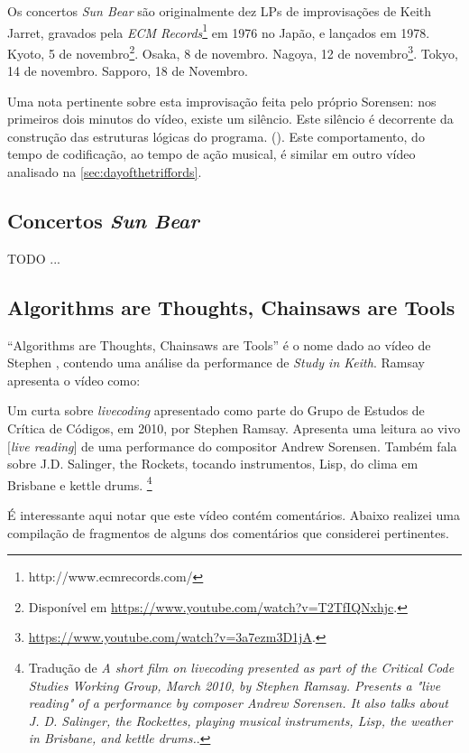\documentclass[
	12pt,				%
	openright,			%
	twoside,			%
	a4paper,			%
	english,			%
	french,				%
	spanish,			%
        italian,                        %
	brazil				%
	]{abntex2}
\begin{document}
Os concertos \emph{Sun Bear} são originalmente dez LPs  de improvisações de Keith Jarret, gravados pela \emph{ECM Records}\footnote{http://www.ecmrecords.com/} em 1976 no Japão, e lançados em 1978. Kyoto, 5 de novembro\footnote{Disponível em \url{https://www.youtube.com/watch?v=T2TfIQNxhjc}.}. Osaka, 8 de novembro. Nagoya, 12 de novembro\footnote{\url{https://www.youtube.com/watch?v=3a7ezm3D1jA}.}. Tokyo, 14 de novembro. Sapporo, 18 de Novembro.

Uma nota pertinente sobre esta improvisação feita pelo próprio Sorensen: nos primeiros dois minutos do vídeo, existe um silêncio. Este silêncio é decorrente da construção das estruturas lógicas do programa. (). Este comportamento, do tempo de codificação, ao tempo de ação musical, é similar em outro vídeo analisado na  \autoref{sec:dayofthetriffords}. 

\subsection{Concertos \emph{Sun Bear}}

TODO ...

\subsection{Algorithms are Thoughts, Chainsaws are Tools}

``Algorithms are Thoughts, Chainsaws are Tools'' é o nome dado ao vídeo de Stephen , contendo uma análise da performance de \emph{Study in Keith}. Ramsay apresenta o vídeo como:

\begin{citacao}
Um curta sobre \emph{livecoding} apresentado como parte do Grupo de Estudos de Crítica de Códigos, em 2010, por Stephen Ramsay. Apresenta uma leitura ao vivo $[$\emph{live reading}$]$ de uma performance do compositor Andrew Sorensen. Também fala sobre J.D. Salinger, the Rockets, tocando instrumentos, Lisp, do clima em Brisbane e kettle drums. \footnote{Tradução de \emph{A short film on livecoding presented as part of the Critical Code Studies Working Group, March 2010, by Stephen Ramsay. Presents a "live reading" of a performance by composer Andrew Sorensen. It also talks about J. D. Salinger, the Rockettes, playing musical instruments, Lisp, the weather in Brisbane, and kettle drums.}.}
\end{citacao}
É interessante aqui notar que este vídeo contém comentários. Abaixo realizei uma compilação de fragmentos de alguns dos comentários que considerei pertinentes. 
\end{document}
